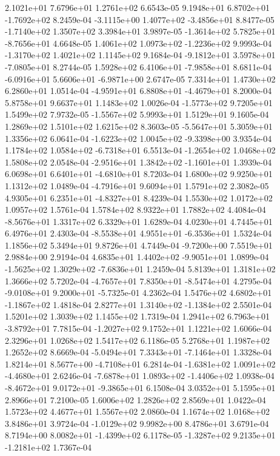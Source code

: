 2.1021e+01 7.6796e+01 1.2761e+02  6.6543e-05
 9.1948e+01  6.8702e+01 -1.7692e+02  8.2459e-04
-3.1115e+00  1.4077e+02 -3.4856e+01  8.8477e-05
-1.7140e+02  1.3507e+02  3.3984e+01  3.9897e-05
-1.3614e+02  5.7825e+01 -8.7656e+01  4.6648e-05
 1.4061e+02  1.0973e+02 -1.2236e+02  9.9993e-04
-1.3170e+02  1.4021e+02  1.1145e+02  9.1684e-04
-9.1812e+01  3.5978e+01 -7.0805e+01  8.2744e-05
 1.5928e+02  6.4106e+01 -7.9858e+01  8.6811e-04
-6.0916e+01  5.6606e+01 -6.9871e+00  2.6747e-05
7.3314e+01 1.4730e+02 6.2860e+01  1.0514e-04
-4.9591e+01  6.8808e+01 -4.4679e+01  8.2000e-04
5.8758e+01 9.6637e+01 1.1483e+02  1.0026e-04
-1.5773e+02  9.7205e+01  1.5499e+02  7.9732e-05
-1.5567e+02  5.9993e+01  1.5129e+01  9.1605e-04
1.2869e+02 1.5101e+02 1.6215e+02  8.3603e-05
-5.5647e+01  5.3059e+01  1.3356e+02  6.0641e-04
-1.6223e+02  1.0045e+02 -9.3398e+00  3.9354e-04
 1.1784e+02  1.0584e+02 -6.7318e+01  6.5513e-04
-1.2654e+02  1.0468e+02  1.5808e+02  2.0548e-04
-2.9516e+01  1.3842e+02 -1.1601e+01  1.3939e-04
 6.0698e+01  6.6401e+01 -4.6810e+01  8.7203e-04
1.6800e+02 9.9250e+01 1.1312e+02  1.0489e-04
-4.7916e+01  9.6094e+01  1.5791e+02  2.3082e-05
 4.9305e+01  6.2351e+01 -4.8327e+01  8.4239e-04
1.5530e+02 1.0172e+02 1.0957e+02  1.5761e-04
1.5784e+02 8.9322e+01 1.7882e+02  4.4084e-04
-8.5676e+01  1.3317e+02  6.3329e+01  1.6289e-04
4.0230e+01 4.7445e+01 6.4976e+01  2.4303e-04
-8.5538e+01  4.9551e+01 -6.3536e+01  1.5324e-04
1.1856e+02 5.3494e+01 9.8726e+01  4.7449e-04
-9.7200e+00  7.5519e+01  2.9884e+00  2.9194e-04
 4.6835e+01  1.4402e+02 -9.9051e+01  1.0899e-04
-1.5625e+02  1.3029e+02 -7.6836e+01  1.2459e-04
5.8139e+01 1.3181e+02 1.3666e+02  5.7202e-04
-4.7657e+01  7.8350e+01 -8.5474e+01  4.2795e-04
-9.0108e+01  9.2000e+01 -5.7325e-01  4.2362e-04
 1.5476e+02  4.6802e+01 -1.1867e+02  1.4818e-04
 2.8277e+01  1.3140e+02 -1.1384e+02  2.5501e-04
1.5201e+02 1.3039e+02 1.1455e+02  1.7319e-04
 1.2941e+02  6.7963e+01 -3.8792e+01  7.7815e-04
-1.2027e+02  9.1752e+01  1.1221e+02  1.6066e-04
2.3296e+01 1.0268e+02 1.5417e+02  6.1186e-05
5.2768e+01 1.1987e+02 1.2652e+02  8.6669e-04
-5.0494e+01  7.3343e+01 -7.1464e+01  1.3328e-04
 1.8214e+01  8.5677e+00 -4.7108e+01  6.2814e-04
-1.6381e+02  1.0091e+02 -4.4680e+01  2.6246e-04
-7.6878e+01  1.0893e+02 -1.4406e+02  1.0938e-04
-8.4672e+01  9.0172e+01 -9.3865e+01  6.1508e-04
3.0352e+01 5.1595e+01 2.8966e+01  7.2100e-05
1.6006e+02 1.2826e+02 2.8569e+01  1.0422e-04
1.5723e+02 4.4677e+01 1.5567e+02  2.0860e-04
1.1674e+02 1.0168e+02 3.8486e+01  3.9724e-04
-1.0129e+02  9.9982e+00  8.4786e+01  3.6791e-04
 8.7194e+00  8.0082e+01 -1.4399e+02  6.1178e-05
-1.3287e+02  9.2135e+01 -1.2181e+02  1.7367e-04
